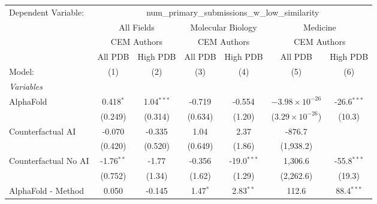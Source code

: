 \begingroup
\centering
\begin{tabular}{lcccccc}
   \tabularnewline \midrule \midrule
   Dependent Variable: & \multicolumn{6}{c}{num\_primary\_submissions\_w\_low\_similarity}\\
 & \multicolumn{2}{c}{All Fields} & \multicolumn{2}{c}{Molecular Biology} & \multicolumn{2}{c}{Medicine} \\
\cmidrule(lr){2-3} \cmidrule(lr){4-5} \cmidrule(lr){6-7}
 & \multicolumn{2}{c}{CEM Authors} & \multicolumn{2}{c}{CEM Authors} & \multicolumn{2}{c}{CEM Authors} \\
\cmidrule(lr){2-3} \cmidrule(lr){4-5} \cmidrule(lr){6-7}
 & \multicolumn{1}{c}{All PDB} & \multicolumn{1}{c}{High PDB} & \multicolumn{1}{c}{All PDB} & \multicolumn{1}{c}{High PDB} & \multicolumn{1}{c}{All PDB} & \multicolumn{1}{c}{High PDB} \\
\cmidrule(lr){2-2} \cmidrule(lr){3-3} \cmidrule(lr){4-4} \cmidrule(lr){5-5} \cmidrule(lr){6-6} \cmidrule(lr){7-7}
   Model:                                                     & (1)           & (2)           & (3)        & (4)           & (5)                      & (6)\\  
   \midrule
   \emph{Variables}\\
   AlphaFold                                                  & 0.418$^{*}$   & 1.04$^{***}$  & -0.719     & -0.554        & $-3.98\times 10^{-26}$   & -26.6$^{***}$\\   
                                                              & (0.249)       & (0.314)       & (0.634)    & (1.20)        & ($3.29\times 10^{-26}$)  & (10.3)\\   
   Counterfactual AI                                          & -0.070        & -0.335        & 1.04       & 2.37          & -876.7                   &   \\   
                                                              & (0.420)       & (0.520)       & (0.649)    & (1.86)        & (1,938.2)                &   \\   
   Counterfactual No AI                                       & -1.76$^{**}$  & -1.77         & -0.356     & -19.0$^{***}$ & 1,306.6                  & -55.8$^{***}$\\   
                                                              & (0.752)       & (1.34)        & (1.62)     & (1.29)        & (2,262.6)                & (19.3)\\   
   AlphaFold - Method                                         & 0.050         & -0.145        & 1.47$^{*}$ & 2.83$^{**}$   & 112.6                    & 88.4$^{***}$\\   

\end{tabular}

